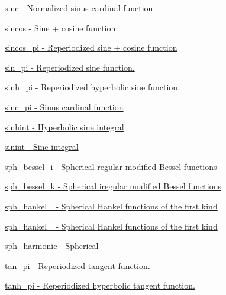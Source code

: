 \begin{DoxyItemize}
\item \hyperlink{group__gnu__math__spec__func_ga6a11b9d949ab86f9fd170dcf0d3b1251}{sinc -\/ Normalized sinus cardinal function}
\item \hyperlink{group__gnu__math__spec__func_ga8041c24b528475bcf8a4178e484652a3}{sincos -\/ Sine + cosine function}
\item \hyperlink{group__gnu__math__spec__func_ga011b1b2431b5f0467f7e3688b14628c6}{sincos\+\_\+pi -\/ Reperiodized sine + cosine function}
\item \hyperlink{group__gnu__math__spec__func_ga8fcd01a56e0c16d7568026c0bb4312eb}{sin\+\_\+pi -\/ Reperiodized sine function.}
\item \hyperlink{group__gnu__math__spec__func_gab004f7356231c96ae819d72e5d75b8dd}{sinh\+\_\+pi -\/ Reperiodized hyperbolic sine function.}
\item \hyperlink{group__gnu__math__spec__func_ga3dbc3831c1bd9f2a8be05496db9375a0}{sinc\+\_\+pi -\/ Sinus cardinal function}
\item \hyperlink{group__gnu__math__spec__func_ga203079a2b70127f16a8c434ea55d4e06}{sinhint -\/ Hyperbolic sine integral}
\item \hyperlink{group__gnu__math__spec__func_gaa588265d28710d36c7c4efa7d4f44ca4}{sinint -\/ Sine integral}
\item \hyperlink{group__gnu__math__spec__func_gad168511a86d4d25db99e2b08d5da038b}{sph\+\_\+bessel\+\_\+i -\/ Spherical regular modified Bessel functions}
\item \hyperlink{group__gnu__math__spec__func_ga9ad96c43b15e2c53d2f1b743e2eaa90f}{sph\+\_\+bessel\+\_\+k -\/ Spherical iregular modified Bessel functions}
\item \hyperlink{group__gnu__math__spec__func_ga04c91059810f366e3366fadef9084be7}{sph\+\_\+hankel\+\_ -\/ Spherical Hankel functions of the first kind}
\item \hyperlink{group__gnu__math__spec__func_gafb5debe7f7db9e9e456c065acf738f64}{sph\+\_\+hankel\+\_ -\/ Spherical Hankel functions of the first kind}
\item \hyperlink{group__gnu__math__spec__func_gadca3d25c4f7eed15099d8f80681d4055}{sph\+\_\+harmonic -\/ Spherical}
\item \hyperlink{group__gnu__math__spec__func_ga5029c1e804c1c9b28949b5ef00237c08}{tan\+\_\+pi -\/ Reperiodized tangent function.}
\item \hyperlink{group__gnu__math__spec__func_ga5f0c92cb16210a8d087327ff2c048115}{tanh\+\_\+pi -\/ Reperiodized hyperbolic tangent function.}

\end{DoxyItemize}
